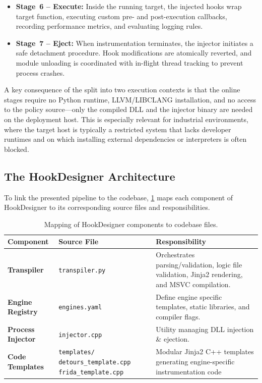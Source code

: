 \begin{itemize}
	\item \textbf{Stage~6 -- Execute:}
	Inside the running target, the injected hooks wrap target function, executing custom pre- and post-execution callbacks, recording performance metrics, and evaluating logging rules.
	
	\item \textbf{Stage~7 -- Eject:}
	When instrumentation terminates, the injector initiates a safe detachment procedure. Hook modifications are atomically reverted, and module unloading is coordinated with in-flight thread tracking to prevent process crashes.
\end{itemize}

A key consequence of the split into two execution contexts is that the online stages require no Python runtime, LLVM/LIBCLANG installation, and no access to the policy source---only the compiled \ac{DLL} and the injector binary are needed on the deployment host.
This is especially relevant for industrial environments, where the target host is typically a restricted system that lacks developer runtimes and on which installing external dependencies or interpreters is often blocked.

\subsection{The HookDesigner Architecture}
\label{subsec:component_mapping}

To link the presented pipeline to the codebase, \cref{tab:component_mapping} maps each component of HookDesigner to its corresponding source files and responsibilities.

\begin{table}[H]
	\centering
	\small
	\begin{tabular}{p{3.2cm}p{4.0cm}p{6.6cm}}
		\toprule
		\textbf{Component} & \textbf{Source File} & \textbf{Responsibility} \\
		\midrule
		\textbf{Transpiler} & \texttt{transpiler.py} & Orchestrates parsing/validation, logic file validation, Jinja2 rendering, and MSVC compilation. \\
		\addlinespace
		\textbf{Engine Registry} & \texttt{engines.yaml} & Define engine specific templates, static libraries, and compiler flags. \\
		\addlinespace
		\textbf{Process Injector} & \texttt{injector.cpp} & Utility managing \ac{DLL} injection \& ejection. \\
		\addlinespace
		\textbf{Code Templates} & \texttt{templates/}
		\texttt{detours\_template.cpp} \newline
	 	\texttt{frida\_template.cpp}
		& Modular Jinja2 C++ templates generating engine-specific instrumentation code \\
		\bottomrule
	\end{tabular}
	\caption{Mapping of HookDesigner components to codebase files.}
	\label{tab:component_mapping}
\end{table}

